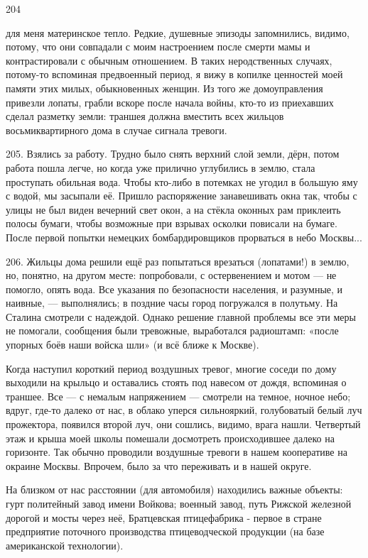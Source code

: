 204

для меня материнское тепло. Редкие, душевные эпизоды запомнились, видимо, потому, что они совпадали с моим настроением после смерти мамы и контрастировали с обычным отношением. В таких неродственных случаях, потому-то вспоминая предвоенный период, я вижу в копилке ценностей моей памяти этих милых, обыкновенных женщин. Из того же домоуправления привезли лопаты, грабли вскоре после начала войны, кто-то из приехавших сделал разметку земли: траншея должна вместить всех жильцов восьмиквартирного дома в случае сигнала тревоги.

205. Взялись за работу. Трудно было снять верхний слой земли, дёрн, потом работа пошла легче, но когда уже прилично углубились в землю, стала проступать обильная вода. Чтобы кто-либо в потемках не угодил в большую яму с водой, мы засыпали её. Пришло распоряжение занавешивать окна так, чтобы с улицы не был виден вечерний свет окон, а на стёкла оконных рам приклеить полосы бумаги, чтобы возможные при взрывах осколки повисали на бумаге. После первой попытки немецких бомбардировщиков прорваться в небо Москвы...

206.
Жильцы дома решили ещё раз попытаться врезаться (лопатами!) в землю, но, понятно, на другом месте: попробовали, с остервенением и мотом — не помогло, опять вода. Все указания по безопасности населения, и разумные, и наивные, — выполнялись; в поздние часы город погружался в полутьму. На Сталина смотрели с надеждой.
Однако решение главной проблемы все эти меры не помогали, сообщения были тревожные, выработался радиоштамп: «после упорных боёв наши войска шли» (и всё ближе к Москве).

Когда наступил короткий период воздушных тревог, многие соседи по дому выходили на крыльцо и оставались стоять под навесом от дождя, вспоминая о траншее. Все — с немалым напряжением — смотрели на темное, ночное небо; вдруг, где-то далеко от нас, в облако уперся сильнояркий, голубоватый белый луч прожектора, появился второй луч, они сошлись, видимо, врага нашли. Четвертый этаж и крыша моей школы помешали досмотреть происходившее далеко на горизонте. Так обычно проводили воздушные тревоги в нашем кооперативе на окраине Москвы. Впрочем, было за что переживать и в нашей округе.

На близком от нас расстоянии (для автомобиля) находились важные объекты: гурт политейный завод имени Войкова; военный завод, путь Рижской железной дорогой и мосты через неё, Братцевская птицефабрика - первое в стране предприятие поточного производства птицеводческой продукции (на базе американской технологии).

